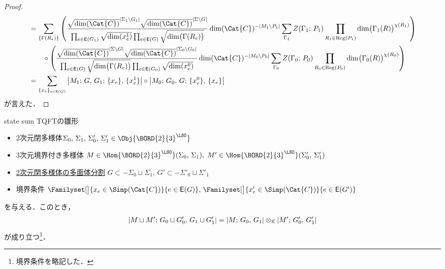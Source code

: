 \documentclass[TQFT_main]{subfiles}
\begin{document}
\begin{proof}
\begin{align}
        &= \sum_{\{\Gamma (R_e)\}} \left( \frac{\sqrt{\dim(\Cat{C})}^{\abs{\Sigma_1 \setminus G_1}} \sqrt{\dim(\Cat{C})}^{\abs{\Sigma\setminus G}}}{\prod_{e \in \mathsf{E} (G_1)} \sqrt{\dim (x^1_e)} \prod_{e \in \mathsf{E}(G)} \sqrt{\dim \bigl( \Gamma(R_e) \bigr) }} \dim(\Cat{C})^{-\abs{M_1 \setminus P_1}}\sum_{\Gamma_1} Z (\Gamma_1;\, P_1) \prod_{R_1 \in \mathrm{Reg}(P_1)} \dim \bigl( \Gamma_1(R) \bigr)^{\chi(R_1)} \right) \\
        &\qquad \circ \left( \frac{\sqrt{\dim(\Cat{C})}^{\abs{\Sigma \setminus G}} \sqrt{\dim(\Cat{C})}^{\abs{\Sigma_0\setminus G_0}}}{\prod_{e \in \mathsf{E} (G)} \sqrt{\dim \bigl( \Gamma (R_e) \bigr)} \prod_{e \in \mathsf{E} (G_0)} \sqrt{\dim (x^0_e)} } \dim(\Cat{C})^{-\abs{M_0 \setminus P_0}} \sum_{\Gamma_0} Z (\Gamma_0;\, P_0) \prod_{R_0 \in \mathrm{Reg}(P_0)} \dim \bigl( \Gamma_0(R) \bigr)^{\chi(R_0)} \right) \\
        &= \sum_{\{x_e\}_{e \in \mathsf{E}(G)}} \abs{M_1;\, G,\, G_1;\, \{x_e\},\, \{x^1_e\}} \circ \abs{M_0;\, G_0,\, G;\, \{x^0_e\},\, \{x_e\}}
    \end{align}
    \normalsize
    が言えた．
\end{proof}

\begin{mylem}[label=lem:statesum-premon]{state sum TQFTの雛形}
    \begin{itemize}
        \item 2次元閉多様体$\Sigma_0,\, \Sigma_1,\, \Sigma'_0,\, \Sigma'_1 \in \Obj{\BORD{2}{3}^{\LSO}}$ 
        \item 3次元境界付き多様体 $M \in \Hom{\BORD{2}{3}^{\LSO}}(\Sigma_0,\, \Sigma_1),\; M' \in \Hom{\BORD{2}{3}^{\LSO}} (\Sigma'_0,\, \Sigma'_1)$
        \item \hyperref[def:skeleton-2mfd]{2次元閉多様体の多面体分割} $G \subset -\Sigma_0 \sqcup \Sigma_1,\, G' \subset -\Sigma'_0 \sqcup \Sigma'_1$
        \item 境界条件 $\Familyset[\big]{x_e \in \Simp(\Cat{C})}{e \in \mathsf{E}(G)},\, \Familyset[\big]{x'_e \in \Simp(\Cat{C})}{e \in \mathsf{E}(G')}$
    \end{itemize}
    を与える．このとき，
    \begin{align}
        \abs{M \sqcup M';\, G_0 \sqcup G'_0,\, G_1 \sqcup G'_1} = \abs{M;\, G_0,\, G_1} \otimes_{\mathbb{K}} \abs{M';\, G'_0,\, G'_1}
    \end{align}
    が成り立つ\footnote{境界条件を略記した．}．
\end{mylem}
\end{document}
